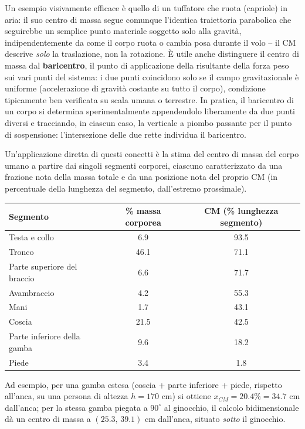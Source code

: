 \documentclass[a4paper,11pt]{article}
\begin{document}
Un esempio visivamente efficace è quello di un tuffatore che ruota (capriole) in aria: il suo centro di massa segue comunque l'identica traiettoria parabolica che seguirebbe un semplice punto materiale soggetto solo alla gravità, indipendentemente da come il corpo ruota o cambia posa durante il volo -- il CM descrive \emph{solo} la traslazione, non la rotazione. È utile anche distinguere il centro di massa dal \textbf{baricentro}, il punto di applicazione della risultante della forza peso sui vari punti del sistema: i due punti coincidono solo se il campo gravitazionale è uniforme (accelerazione di gravità costante su tutto il corpo), condizione tipicamente ben verificata su scala umana o terrestre. In pratica, il baricentro di un corpo si determina sperimentalmente appendendolo liberamente da due punti diversi e tracciando, in ciascun caso, la verticale a piombo passante per il punto di sospensione: l'intersezione delle due rette individua il baricentro.

Un'applicazione diretta di questi concetti è la stima del centro di massa del corpo umano a partire dai singoli segmenti corporei, ciascuno caratterizzato da una frazione nota della massa totale e da una posizione nota del proprio CM (in percentuale della lunghezza del segmento, dall'estremo prossimale).

\begin{center}
\small
\begin{tabular}{lcc}
\toprule
\textbf{Segmento} & \textbf{\% massa corporea} & \textbf{CM (\% lunghezza segmento)} \\
\midrule
Testa e collo & 6.9 & 93.5 \\
Tronco & 46.1 & 71.1 \\
Parte superiore del braccio & 6.6 & 71.7 \\
Avambraccio & 4.2 & 55.3 \\
Mani & 1.7 & 43.1 \\
Coscia & 21.5 & 42.5 \\
Parte inferiore della gamba & 9.6 & 18.2 \\
Piede & 3.4 & 1.8 \\
\bottomrule
\end{tabular}
\end{center}

Ad esempio, per una gamba estesa (coscia + parte inferiore + piede, rispetto all'anca, su una persona di altezza $h=170$ cm) si ottiene $x_{CM}=20.4\%=34.7$ cm dall'anca; per la stessa gamba piegata a $90^{\circ}$ al ginocchio, il calcolo bidimensionale dà un centro di massa a $(25.3,\,39.1)$ cm dall'anca, situato \emph{sotto} il ginocchio.
\end{document}
